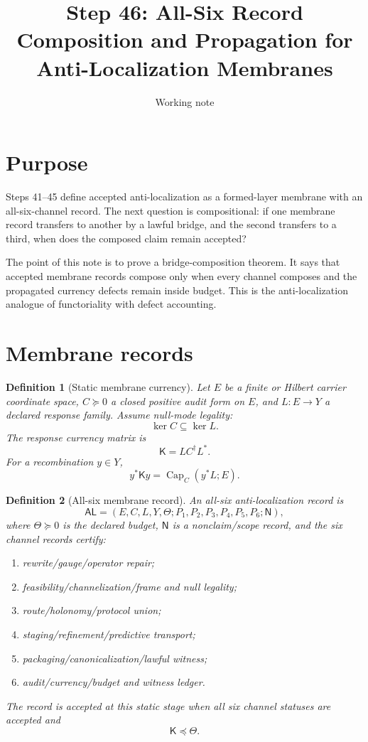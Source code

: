 \documentclass[11pt]{article}
\title{Step 46: All-Six Record Composition and Propagation for Anti-Localization Membranes}
\author{Working note}
\date{}
\newtheorem{definition}{Definition}
\newcommand{\K}{\mathsf K}
\newcommand{\AL}{\mathsf{AL}}
\newcommand{\Capacity}{\operatorname{Cap}}
\newcommand{\suc}{\succeq}
\begin{document}
\maketitle

\section{Purpose}
Steps 41--45 define accepted anti-localization as a formed-layer membrane with an all-six-channel record.  The next question is compositional: if one membrane record transfers to another by a lawful bridge, and the second transfers to a third, when does the composed claim remain accepted?

The point of this note is to prove a bridge-composition theorem.  It says that accepted membrane records compose only when every channel composes and the propagated currency defects remain inside budget.  This is the anti-localization analogue of functoriality with defect accounting.

\section{Membrane records}
\begin{definition}[Static membrane currency]
Let $E$ be a finite or Hilbert carrier coordinate space, $C\suc0$ a closed positive audit form on $E$, and $L:E\to Y$ a declared response family.  Assume null-mode legality:
\[
\ker C\subseteq \ker L.
\]
The response currency matrix is
\[
\K=L C^\dagger L^*.
\]
For a recombination $y\in Y$,
\[
 y^*\K y=\Capacity_C(y^*L;E).
\]
\end{definition}

\begin{definition}[All-six membrane record]
An all-six anti-localization record is
\[
\AL=(E,C,L,Y,\Theta;P_1,P_2,P_3,P_4,P_5,P_6;\mathsf N),
\]
where $\Theta\suc0$ is the declared budget, $\mathsf N$ is a nonclaim/scope record, and the six channel records certify:
\begin{enumerate}[label=$P_\arabic*$:]
\item rewrite/gauge/operator repair;
\item feasibility/channelization/frame and null legality;
\item route/holonomy/protocol union;
\item staging/refinement/predictive transport;
\item packaging/canonicalization/lawful witness;
\item audit/currency/budget and witness ledger.
\end{enumerate}
The record is accepted at this static stage when all six channel statuses are accepted and
\[
\K\preceq\Theta.
\]
\end{definition}
\end{document}

